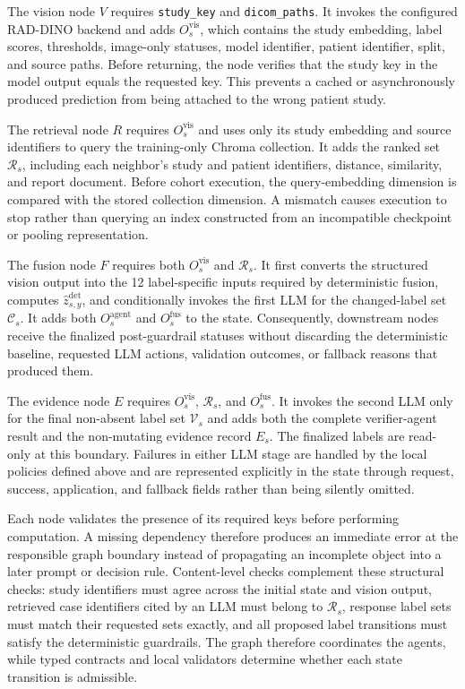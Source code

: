 The vision node $V$ requires \texttt{study\_key} and \texttt{dicom\_paths}. It invokes the configured RAD-DINO backend and adds $O_s^{\mathrm{vis}}$, which contains the study embedding, label scores, thresholds, image-only statuses, model identifier, patient identifier, split, and source paths. Before returning, the node verifies that the study key in the model output equals the requested key. This prevents a cached or asynchronously produced prediction from being attached to the wrong patient study.

The retrieval node $R$ requires $O_s^{\mathrm{vis}}$ and uses only its study embedding and source identifiers to query the training-only Chroma collection. It adds the ranked set $\mathcal R_s$, including each neighbor's study and patient identifiers, distance, similarity, and report document. Before cohort execution, the query-embedding dimension is compared with the stored collection dimension. A mismatch causes execution to stop rather than querying an index constructed from an incompatible checkpoint or pooling representation.

The fusion node $F$ requires both $O_s^{\mathrm{vis}}$ and $\mathcal R_s$. It first converts the structured vision output into the 12 label-specific inputs required by deterministic fusion, computes $\widehat z^{\mathrm{det}}_{s,y}$, and conditionally invokes the first LLM for the changed-label set $\mathcal C_s$. It adds both $O_s^{\mathrm{agent}}$ and $O_s^{\mathrm{fus}}$ to the state. Consequently, downstream nodes receive the finalized post-guardrail statuses without discarding the deterministic baseline, requested LLM actions, validation outcomes, or fallback reasons that produced them.

The evidence node $E$ requires $O_s^{\mathrm{vis}}$, $\mathcal R_s$, and $O_s^{\mathrm{fus}}$. It invokes the second LLM only for the final non-absent label set $\mathcal V_s$ and adds both the complete verifier-agent result and the non-mutating evidence record $E_s$. The finalized labels are read-only at this boundary. Failures in either LLM stage are handled by the local policies defined above and are represented explicitly in the state through request, success, application, and fallback fields rather than being silently omitted.

Each node validates the presence of its required keys before performing computation. A missing dependency therefore produces an immediate error at the responsible graph boundary instead of propagating an incomplete object into a later prompt or decision rule. Content-level checks complement these structural checks: study identifiers must agree across the initial state and vision output, retrieved case identifiers cited by an LLM must belong to $\mathcal R_s$, response label sets must match their requested sets exactly, and all proposed label transitions must satisfy the deterministic guardrails. The graph therefore coordinates the agents, while typed contracts and local validators determine whether each state transition is admissible.

